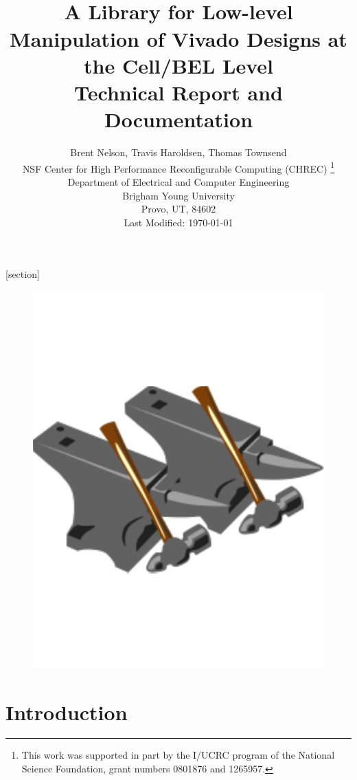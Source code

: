 \documentclass[12pt]{article}
\begin{document}
[section]

\date{}
\title{{\bf \Huge {}}\\[0.1in]
A Library for Low-level Manipulation 
of Vivado Designs at the Cell/BEL Level\\[0.3in]
Technical Report and Documentation\\[0.1in]
}
\author{\Large Brent Nelson, Travis Haroldsen, Thomas Townsend\\[0.2in] \large NSF Center for High Performance Reconfigurable Computing (CHREC)
\thanks{This work was supported in part by the I/UCRC program of the National
 Science Foundation, grant numbers 0801876 and 1265957.}\\
\large Department of Electrical and Computer Engineering  \\
\large  Brigham Young University \\
\large  Provo, UT, 84602 \\[0.7in]
\large Last Modified: \today \\[0.05in]
}


\maketitle
\begin{figure}[H]
\centering
\includegraphics[width=0.4\columnwidth]{logo}
\end{figure}
\newpage
\tableofcontents


% 

\newpage
\section{Introduction}
\end{document}
